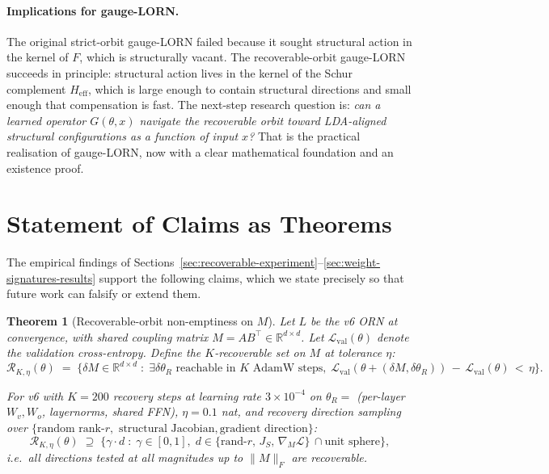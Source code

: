 \documentclass[11pt, a4paper]{article}
\theoremstyle{plain}
\newtheorem{theorem}{Theorem}
\theoremstyle{definition}
\theoremstyle{remark}
\begin{document}
\paragraph{Implications for gauge-LORN.}
The original strict-orbit gauge-LORN failed because it sought structural action in the kernel of $F$, which is structurally vacant.
The recoverable-orbit gauge-LORN succeeds in principle: structural action lives in the kernel of the Schur complement $H_{\text{eff}}$, which is large enough to contain structural directions and small enough that compensation is fast.
The next-step research question is: \emph{can a learned operator $G(\theta, x)$ navigate the recoverable orbit toward LDA-aligned structural configurations as a function of input $x$?}
That is the practical realisation of gauge-LORN, now with a clear mathematical foundation and an existence proof.


\section{Statement of Claims as Theorems}
\label{sec:theorems}

The empirical findings of Sections~\ref{sec:recoverable-experiment}--\ref{sec:weight-signatures-results} support the following claims, which we state precisely so that future work can falsify or extend them.

\begin{theorem}[Recoverable-orbit non-emptiness on $M$]
\label{thm:recoverable-existence}
Let $L$ be the v6 ORN at convergence, with shared coupling matrix $M = AB^{\!\top} \in \mathbb{R}^{d \times d}$.
Let $\mathcal{L}_{\text{val}}(\theta)$ denote the validation cross-entropy.
Define the $K$-recoverable set on $M$ at tolerance $\eta$:
\begin{equation}
\mathcal{R}_{K, \eta}(\theta) \;=\; \big\{ \delta M \in \mathbb{R}^{d \times d} \;:\; \exists \delta\theta_R \text{ reachable in } K \text{ AdamW steps},\; \mathcal{L}_{\text{val}}(\theta + (\delta M, \delta\theta_R)) \,-\, \mathcal{L}_{\text{val}}(\theta) \,<\, \eta \big\}.
\end{equation}

For v6 with $K = 200$ recovery steps at learning rate $3 \times 10^{-4}$ on $\theta_R = $ (per-layer $W_v, W_o$, layernorms, shared FFN), $\eta = 0.1$ nat, and recovery direction sampling over $\{\text{random rank-}r,\text{ structural Jacobian}, \text{gradient direction}\}$:
\begin{equation}
\mathcal{R}_{K, \eta}(\theta) \;\supseteq\; \big\{ \gamma \cdot d \;:\; \gamma \in [0, 1],\; d \in \{\text{rand-}r,\, J_S,\, \nabla_M\!\mathcal{L}\}\, \cap \text{unit sphere} \big\},
\end{equation}
i.e.\ all directions tested at all magnitudes up to $\|M\|_F$ are recoverable.
\end{theorem}
\end{document}
